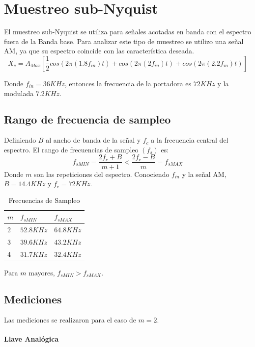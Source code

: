 \documentclass[../../ASSD_TP1_G7.tex]{subfiles}
\begin{document}
\chapter*{Muestreo sub-Nyquist}
El muestreo sub-Nyquist se utiliza para se\~nales acotadas en banda con el espectro fuera de la Banda base. Para analizar este tipo de muestreo se utilizo una se\~nal AM, ya que su espectro coincide con las característica deseada.
\begin{equation}
X_c=A_{Max}[\frac{1}{2}cos(2\pi (1.8 f_{in})t)+cos(2\pi (2 f_{in})t)+cos(2\pi (2.2 f_{in})t)]
\end{equation}\label{eq:inputSignlan}

Donde $f_{in}= 36KHz$, entonces la frecuencia de la portadora es $72KHz$ y la modulada $7.2KHz$.
\section*{Rango de frecuencia de sampleo}
Definiendo $B$ al ancho de banda de la se\~nal y $f_c$ a la frecuencia central del espectro. El rango de frecuencias de sampleo $(f_s)$ es:
\begin{equation}
f_{sMIN}=\frac{2f_c + B}{m+1} < \frac{2f_c - B}{m} = f_{sMAX}
\end{equation}
Donde $m$ son las repeticiones del espectro. Conociendo $f_{in}$ y la se\~nal AM, $B=14.4KHz$ y $f_c=72KHz$.

\begin{table}[htbp]
\begin{center}
\begin{tabular}{|l|l|l|}
\hline
$m$ & $f_{sMIN}$ & $f_{sMAX}$  \\
\hline \hline
2 & $52.8KHz$ & $64.8KHz$ \\ \hline
3 & $39.6KHz$ & $43.2KHz$ \\ \hline
4 & $31.7KHz$ & $32.4KHz$ \\ \hline
\end{tabular}
\caption{Frecuencias de Sampleo}
\label{tabla:fsamp}
\end{center}
\end{table}
Para $m$ mayores, $f_{sMIN}>f_{sMAX}$.
\section*{Mediciones}
Las mediciones se realizaron para el caso de $m=2$.
\subsubsection{Llave Analógica}
\end{document}

